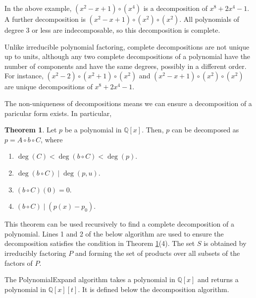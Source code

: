 \documentclass{article}
\theoremstyle{definition}
\newtheorem{thm}{Theorem}[section]
\begin{document}
In the above example, $(x^2-x+1)\circ(x^4)$ is a decomposition of $x^8 + 2x^4 -1$. A further decomposition is $(x^2-x+1)\circ(x^2)\circ(x^2)$. All polynomials of degree 3 or less are indecomposable, so this decomposition is complete.

Unlike irreducible polynomial factoring, complete decompositions are not unique up to units, although any two complete decompositions of a polynomial have the number of components and have the same degrees, possibly in a different order. For instance, $(x^2-2)\circ(x^2+1)\circ(x^2)$ and $(x^2-x+1)\circ(x^2)\circ(x^2)$ are unique decompositions of $x^8 + 2x^4 -1$.

The non-uniqueness of decompositions means we can ensure a decomposition of a paricular form exists. In particular, 

\begin{thm} \label{thm5}
    Let $p$ be a polynomial in $\mathbb{Q}[x]$. Then, $p$ can be decomposed as $p = A \circ b \circ C$, where
    \begin{enumerate}
        \item $\deg(C) < \deg(b \circ C) < \deg(p)$.
        \item $\deg(b \circ C) \mid  \deg(p, u)$.
        \item $(b \circ C)(0) = 0$.
        \item $(b \circ C) \mid (p(x)-p_0)$.
    \end{enumerate}
\end{thm}

This theorem can be used recursively to find a complete decomposition of a polynomial. Lines 1 and 2 of the below algorithm are used to ensure the decomposition satisfies the condition in Theorem \ref{thm5}(4). The set $S$ is obtained by irreducibly factoring $P$ and forming the set of products over all subsets of the factors of $P$.

The PolynomialExpand algorithm takes a polynomial in $\mathbb{Q}[x]$ and returns a polynomial in $\mathbb{Q}[x][t]$. It is defined below the decomposition algorithm.

\newpage
\end{document}
